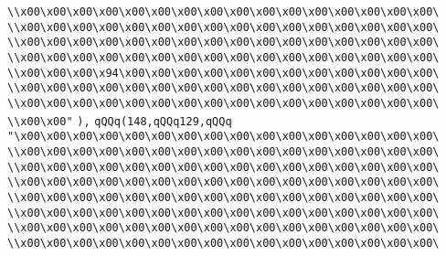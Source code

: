\verb|\\x00\x00\x00\x00\x00\x00\x00\x00\x00\x00\x00\x00\x00\x00\x00\x00\|\newline
\verb|\\x00\x00\x00\x00\x00\x00\x00\x00\x00\x00\x00\x00\x00\x00\x00\x00\|\newline
\verb|\\x00\x00\x00\x00\x00\x00\x00\x00\x00\x00\x00\x00\x00\x00\x00\x00\|\newline
\verb|\\x00\x00\x00\x00\x00\x00\x00\x00\x00\x00\x00\x00\x00\x00\x00\x00\|\newline
\verb|\\x00\x00\x00\x94\x00\x00\x00\x00\x00\x00\x00\x00\x00\x00\x00\x00\|\newline
\verb|\\x00\x00\x00\x00\x00\x00\x00\x00\x00\x00\x00\x00\x00\x00\x00\x00\|\newline
\verb|\\x00\x00\x00\x00\x00\x00\x00\x00\x00\x00\x00\x00\x00\x00\x00\x00\|\newline
\verb|\\x00\x00"|\newline
\verb|),|\newline
\verb|qQQq(148,qQQq129,qQQq|\newline
\verb|"\x00\x00\x00\x00\x00\x00\x00\x00\x00\x00\x00\x00\x00\x00\x00\x00\|\newline
\verb|\\x00\x00\x00\x00\x00\x00\x00\x00\x00\x00\x00\x00\x00\x00\x00\x00\|\newline
\verb|\\x00\x00\x00\x00\x00\x00\x00\x00\x00\x00\x00\x00\x00\x00\x00\x00\|\newline
\verb|\\x00\x00\x00\x00\x00\x00\x00\x00\x00\x00\x00\x00\x00\x00\x00\x00\|\newline
\verb|\\x00\x00\x00\x00\x00\x00\x00\x00\x00\x00\x00\x00\x00\x00\x00\x00\|\newline
\verb|\\x00\x00\x00\x00\x00\x00\x00\x00\x00\x00\x00\x00\x00\x00\x00\x00\|\newline
\verb|\\x00\x00\x00\x00\x00\x00\x00\x00\x00\x00\x00\x00\x00\x00\x00\x00\|\newline
\verb|\\x00\x00\x00\x00\x00\x00\x00\x00\x00\x00\x00\x00\x00\x00\x00\x00\|\newline
